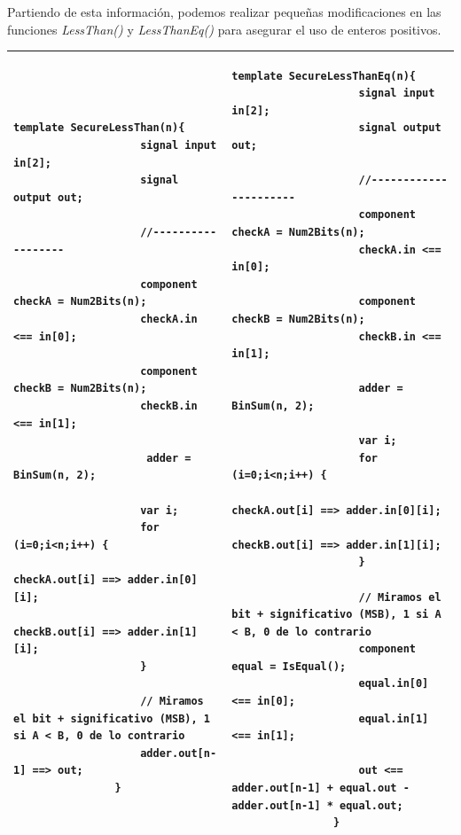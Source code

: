\documentclass[a4paper,10pt]{article}
\begin{document}
		\vspace{0.5cm}
		
		\noindent Partiendo de esta información, podemos realizar pequeñas modificaciones en las funciones \textit{LessThan()} y \textit{LessThanEq()} para asegurar el uso de enteros positivos.
		
		\vspace{0.2cm}
		
		\begin{tabular}{|p{} | p{}|}
			\hline
			\lstset{language=Circom}
			\begin{lstlisting}[language=Circom]
				template SecureLessThan(n){
					signal input in[2];
					signal output out;
					
					//------------------
				
					component checkA = Num2Bits(n);
					checkA.in <== in[0];
					
					component checkB = Num2Bits(n);
					checkB.in <== in[1];
					
					 adder = BinSum(n, 2);
					
					var i;
					for (i=0;i<n;i++) {
						checkA.out[i] ==> adder.in[0][i];
						checkB.out[i] ==> adder.in[1][i];
					}
					
					// Miramos el bit + significativo (MSB), 1 si A < B, 0 de lo contrario
					adder.out[n-1] ==> out;
				}
			\end{lstlisting} 
			
			&
			
			\begin{lstlisting}[language=Circom]
				template SecureLessThanEq(n){
					signal input in[2];
					signal output out;
					
					//----------------------
					component checkA = Num2Bits(n);
					checkA.in <== in[0];
					
					component checkB = Num2Bits(n);
					checkB.in <== in[1];
					
					adder = BinSum(n, 2);
					
					var i;
					for (i=0;i<n;i++) {
						checkA.out[i] ==> adder.in[0][i];
						checkB.out[i] ==> adder.in[1][i];
					}
					
					// Miramos el bit + significativo (MSB), 1 si A < B, 0 de lo contrario
					component equal = IsEqual();
					equal.in[0] <== in[0];
					equal.in[1] <== in[1]; 
					
					out <==	adder.out[n-1] + equal.out - adder.out[n-1] * equal.out;
				}
				
			\end{lstlisting}
			\\
			\hline
		\end{tabular}
			
\end{document}
